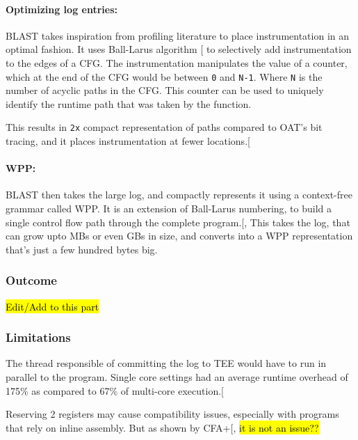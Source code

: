 \documentclass[a4paper, nobind]{templates/ociamthesis}
\begin{document}
\paragraph{Optimizing log entries:}\label{optimizing-log-entries}

BLAST takes inspiration from profiling literature to place instrumentation in
an optimal fashion. It uses Ball-Larus algorithm {[}\citeproc{ref-balllarus}{9}{]} to selectively
add instrumentation to the edges of a CFG. The instrumentation manipulates the value of a counter,
which at the end of the CFG would be between \texttt{0} and \texttt{N-1}. Where \texttt{N} is the number
of acyclic paths in the CFG. This counter can be used to uniquely identify the
runtime path that was taken by the function.

This results in \texttt{2x} compact representation of paths compared to OAT's bit tracing,
and it places instrumentation at fewer locations.{[}\citeproc{ref-blast}{22}{]}

\paragraph{WPP:}\label{wpp}

BLAST then takes the large log, and compactly represents it using a context-free
grammar called WPP. It is an extension of Ball-Larus numbering, to build a single
control flow path through the complete program.{[}, \citeproc{ref-blast}{22}{]}
This takes the log, that can grow upto MBs or even GBs in size, and converts into
a WPP representation that's just a few hundred bytes big.

\subsubsection{Outcome}\label{outcome}

\hl{Edit/Add to this part}

\subsubsection{Limitations}\label{limitations}

The thread responsible of committing the log to TEE would have to run in parallel
to the program. Single core settings had an average runtime overhead of 175\%
as compared to 67\% of multi-core execution.{[}\citeproc{ref-blast}{22}{]}

Reserving 2 registers may cause compatibility issues, especially with programs
that rely on inline assembly. But as shown by CFA+{[}\citeproc{ref-cfaplus}{1}{]},
\hl{it is not an issue??}
\end{document}
